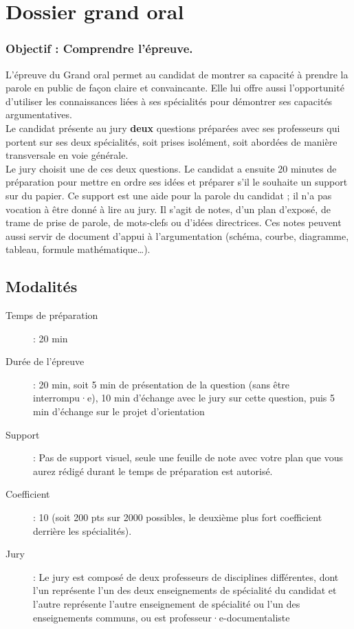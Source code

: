 \chapter*{Dossier grand oral}
\subsection*{\centering Objectif : Comprendre l'épreuve.}

L'épreuve du Grand oral permet au candidat de montrer sa capacité à prendre la parole en public de façon claire et convaincante. Elle lui offre aussi l’opportunité d'utiliser les connaissances liées à ses spécialités pour démontrer ses capacités argumentatives.\\

Le candidat présente au jury \textbf{deux} questions préparées avec ses professeurs qui portent sur ses deux spécialités, soit prises isolément, soit abordées de manière transversale en voie générale.\\

Le jury choisit une de ces deux questions. Le candidat a ensuite 20 minutes de préparation pour mettre en ordre ses idées et préparer s’il le souhaite un support sur du papier. Ce support est une aide pour la parole du candidat ; il n’a pas vocation à être donné à lire au jury.
Il s’agit de notes, d’un plan d’exposé, de trame de prise de parole, de mots-clefs ou d’idées directrices.
Ces notes peuvent aussi servir de document d’appui à l’argumentation (schéma, courbe, diagramme, tableau, formule mathématique…).

\section{Modalités}
\begin{description}
    \item[Temps de préparation] : 20 min
    \item[Durée de l'épreuve] : 20 min, soit 5 min de présentation de la question (sans être interrompu·e), 10 min d'échange avec le jury sur cette question, puis 5 min d'échange sur le projet d'orientation
    \item[Support]: Pas de support visuel, seule une feuille de note avec votre plan que vous aurez rédigé durant le temps de préparation est autorisé. 
    \item[Coefficient]: 10 (soit 200 pts sur 2000 possibles, le deuxième plus fort coefficient derrière les spécialités).
    \item[Jury]: Le jury est composé de deux professeurs de disciplines différentes, dont l'un représente l'un des deux enseignements de spécialité du candidat et l'autre représente l'autre enseignement de spécialité ou l'un des enseignements communs, ou est professeur·e-documentaliste 
\end{description}



